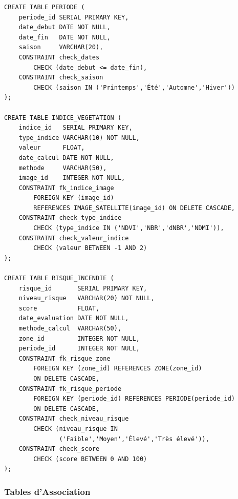 \documentclass[12pt,a4paper]{report}
\begin{document}
\begin{verbatim}
CREATE TABLE PERIODE (
    periode_id SERIAL PRIMARY KEY,
    date_debut DATE NOT NULL,
    date_fin   DATE NOT NULL,
    saison     VARCHAR(20),
    CONSTRAINT check_dates
        CHECK (date_debut <= date_fin),
    CONSTRAINT check_saison
        CHECK (saison IN ('Printemps','Été','Automne','Hiver'))
);

CREATE TABLE INDICE_VEGETATION (
    indice_id   SERIAL PRIMARY KEY,
    type_indice VARCHAR(10) NOT NULL,
    valeur      FLOAT,
    date_calcul DATE NOT NULL,
    methode     VARCHAR(50),
    image_id    INTEGER NOT NULL,
    CONSTRAINT fk_indice_image
        FOREIGN KEY (image_id)
        REFERENCES IMAGE_SATELLITE(image_id) ON DELETE CASCADE,
    CONSTRAINT check_type_indice
        CHECK (type_indice IN ('NDVI','NBR','dNBR','NDMI')),
    CONSTRAINT check_valeur_indice
        CHECK (valeur BETWEEN -1 AND 2)
);

CREATE TABLE RISQUE_INCENDIE (
    risque_id       SERIAL PRIMARY KEY,
    niveau_risque   VARCHAR(20) NOT NULL,
    score           FLOAT,
    date_evaluation DATE NOT NULL,
    methode_calcul  VARCHAR(50),
    zone_id         INTEGER NOT NULL,
    periode_id      INTEGER NOT NULL,
    CONSTRAINT fk_risque_zone
        FOREIGN KEY (zone_id) REFERENCES ZONE(zone_id)
        ON DELETE CASCADE,
    CONSTRAINT fk_risque_periode
        FOREIGN KEY (periode_id) REFERENCES PERIODE(periode_id)
        ON DELETE CASCADE,
    CONSTRAINT check_niveau_risque
        CHECK (niveau_risque IN
               ('Faible','Moyen','Élevé','Très élevé')),
    CONSTRAINT check_score
        CHECK (score BETWEEN 0 AND 100)
);
\end{verbatim}

\subsubsection{Tables d'Association}
\end{document}
